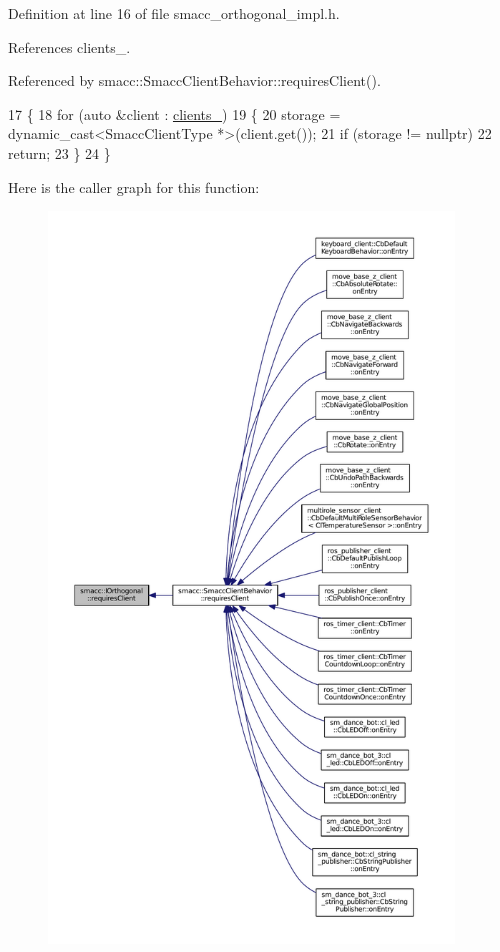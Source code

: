 Definition at line 16 of file smacc\+\_\+orthogonal\+\_\+impl.\+h.



References clients\+\_\+.



Referenced by smacc\+::\+Smacc\+Client\+Behavior\+::requires\+Client().


\begin{DoxyCode}
17 \{
18     \textcolor{keywordflow}{for} (\textcolor{keyword}{auto} &client : \hyperlink{classsmacc_1_1IOrthogonal_ad3e5fb55db8c40ff178b22c92c9c9cd3}{clients\_})
19     \{
20         storage = \textcolor{keyword}{dynamic\_cast<}SmaccClientType *\textcolor{keyword}{>}(client.get());
21         \textcolor{keywordflow}{if} (storage != \textcolor{keyword}{nullptr})
22             \textcolor{keywordflow}{return};
23     \}
24 \}
\end{DoxyCode}


Here is the caller graph for this function\+:
\nopagebreak
\begin{figure}[H]
\begin{center}
\leavevmode
\includegraphics[height=550pt]{classsmacc_1_1IOrthogonal_af1f9cb7aa36255e6bf930613b82ad85c_icgraph}
\end{center}
\end{figure}


